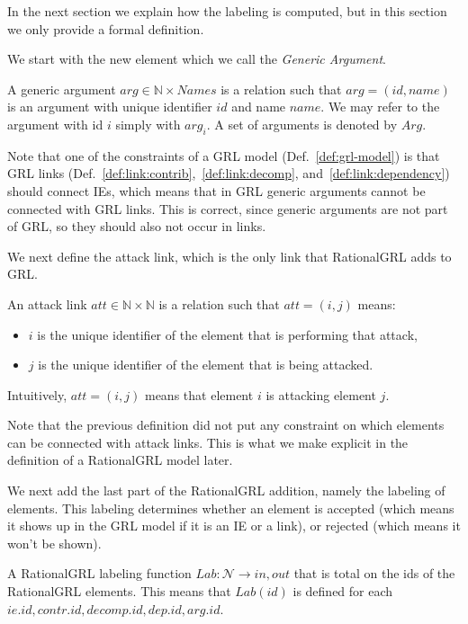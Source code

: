 In the next section we explain how the labeling is computed, but in this section we only provide a formal definition.

We start with the new element which we call the \emph{Generic Argument}.

\begin{definition}
\label{def:generic-argument}
A generic argument $arg \in \mathbb{N}\times Names$ is a relation such that $arg=(id, name)$ is an argument with unique identifier $id$ and name $name$. We may refer to the argument with id $i$ simply with $arg_i$. A set of arguments is denoted by $Arg$.
\end{definition}

Note that one of the constraints of a GRL model (Def.~\ref{def:grl-model}) is that GRL links (Def.~\ref{def:link:contrib},~\ref{def:link:decomp}, and~\ref{def:link:dependency}) should connect IEs, which means that in GRL generic arguments cannot be connected with GRL links. This is correct, since generic arguments are not part of GRL, so they should also not occur in links.

We next define the attack link, which is the only link that RationalGRL adds to GRL. 

\begin{definition}
\label{def:link:attack}
An attack link $att\in \mathbb{N}\times \mathbb{N}$ is a relation such that $att=(i,j)$ means:
\begin{itemize}
\item $i$ is the unique identifier of the element that is performing that attack,
\item $j$ is the unique identifier of the element that is being attacked.
\end{itemize}
Intuitively, $att=(i,j)$ means that element $i$ is attacking element $j$.
\end{definition}

Note that the previous definition did not put any constraint on which elements can be connected with attack links. This is what we make explicit in the definition of a RationalGRL model later.

We next add the last part of the RationalGRL addition, namely the labeling of elements. This labeling determines whether an element is accepted (which means it shows up in the GRL model if it is an IE or a link), or rejected (which means it won't be shown).

\begin{definition}
\label{def:labeling}
A RationalGRL labeling function $Lab:\mathcal{N}\rightarrow {in,out}$ that is total on the ids of the RationalGRL elements. This means that $Lab(id)$ is defined for each $ie.id, contr.id, decomp.id, dep.id, arg.id$.
\end{definition}

